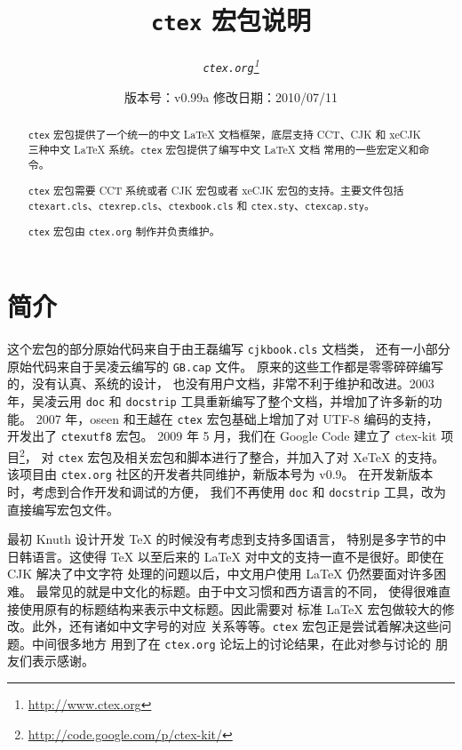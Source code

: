 \documentclass{ltxdoc}
\newcommand{\ctex}{\texttt{ctex}}
\newcommand{\ctexorg}{\texttt{ctex.org}}
\begin{document}
\title{\bf \ctex{} 宏包说明}
\author{\it \ctexorg\thanks{\url{http://www.ctex.org}}}
\date{\small 版本号：v0.99a \ccwd 修改日期：2010/07/11}
\maketitle


\begin{abstract}
\ctex{} 宏包提供了一个统一的中文 \LaTeX{} 文档框架，底层支持 CCT、CJK 和
 xeCJK 三种中文 \LaTeX{} 系统。\ctex{} 宏包提供了编写中文 \LaTeX{} 文档
常用的一些宏定义和命令。

\ctex{} 宏包需要 CCT 系统或者 CJK 宏包或者 xeCJK 宏包的支持。主要文件包括
 \texttt{ctexart.cls}、\texttt{ctexrep.cls}、\texttt{ctexbook.cls} 和
 \texttt{ctex.sty}、\texttt{ctexcap.sty}。

\ctex{} 宏包由 \ctexorg{} 制作并负责维护。
\end{abstract}

\tableofcontents

\section{简介}

这个宏包的部分原始代码来自于由王磊编写 \texttt{cjkbook.cls} 文档类，
还有一小部分原始代码来自于吴凌云编写的 \texttt{GB.cap} 文件。
原来的这些工作都是零零碎碎编写的，没有认真、系统的设计，
也没有用户文档，非常不利于维护和改进。2003 年，吴凌云用 \texttt{doc}
和 \texttt{docstrip} 工具重新编写了整个文档，并增加了许多新的功能。
2007 年，oseen 和王越在 \ctex{} 宏包基础上增加了对 UTF-8 编码的支持，
开发出了 \texttt{ctexutf8} 宏包。
2009 年 5 月，我们在 Google Code 建立了 ctex-kit 项目\footnote{\url{http://code.google.com/p/ctex-kit/}}，
对 \ctex{} 宏包及相关宏包和脚本进行了整合，并加入了对 Xe\TeX{} 的支持。
该项目由 \ctexorg{} 社区的开发者共同维护，新版本号为 v0.9。
在开发新版本时，考虑到合作开发和调试的方便，
我们不再使用 \texttt{doc} 和 \texttt{docstrip} 工具，改为直接编写宏包文件。

最初 Knuth 设计开发 \TeX{} 的时候没有考虑到支持多国语言，
特别是多字节的中日韩语言。这使得 \TeX{} 以至后来的
\LaTeX{} 对中文的支持一直不是很好。即使在 CJK 解决了中文字符
处理的问题以后，中文用户使用 \LaTeX{} 仍然要面对许多困难。
最常见的就是中文化的标题。由于中文习惯和西方语言的不同，
使得很难直接使用原有的标题结构来表示中文标题。因此需要对
标准 \LaTeX{} 宏包做较大的修改。此外，还有诸如中文字号的对应
关系等等。\ctex{} 宏包正是尝试着解决这些问题。中间很多地方
用到了在 \ctexorg{} 论坛上的讨论结果，在此对参与讨论的
朋友们表示感谢。
\end{document}
